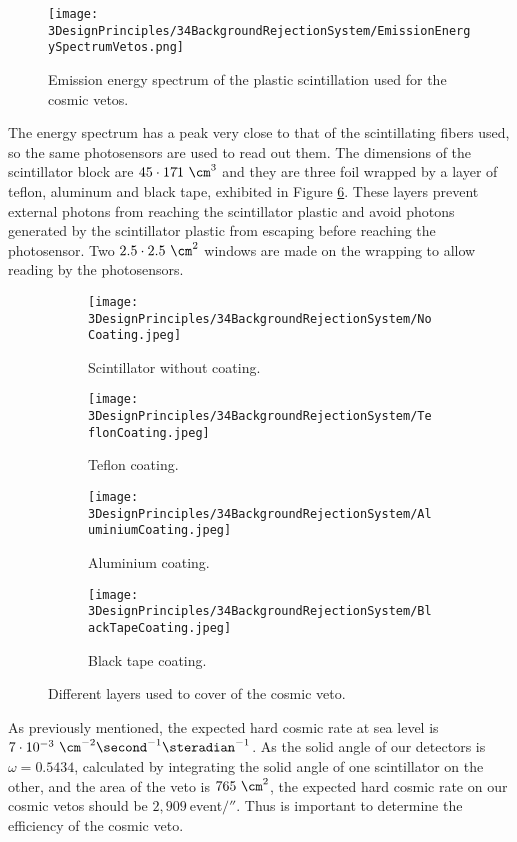 \begin{figure}[]
\centering
\texttt{[image: 3DesignPrinciples/34BackgroundRejectionSystem/EmissionEnergySpectrumVetos.png]}
\caption{Emission energy spectrum of the plastic scintillation used for the cosmic vetos.\label{fig:EmissionEnergySpectrumVeto}~\cite{ScintillatorVeto}}
\end{figure}

The energy spectrum has a peak very close to that of the scintillating fibers used, so the same photosensors are used to read out them. The dimensions of the scintillator block are $45 \cdot{} 17 \dot{} 1~\cm^3$ and they are three foil wrapped by a layer of teflon, aluminum and black tape, exhibited in Figure \ref{fig:LayersVeto}. These layers prevent external photons from reaching the scintillator plastic and avoid photons generated by the scintillator plastic from escaping before reaching the photosensor. Two $2.5\cdot{} 2.5 ~\cm^2$ windows are made on the wrapping to allow reading by the photosensors.


\begin{figure}
\centering
    \begin{subfigure}[b]{0.23\textwidth}
    \centering
    \texttt{[image: 3DesignPrinciples/34BackgroundRejectionSystem/NoCoating.jpeg]}  
    \caption{Scintillator without coating.\label{subfig:PlasticScintillatorNoCoating}}
    \end{subfigure}
    \hfill
    \begin{subfigure}[b]{0.23\textwidth}
    \centering
    \texttt{[image: 3DesignPrinciples/34BackgroundRejectionSystem/TeflonCoating.jpeg]}  
    \caption{Teflon coating.\label{subfig:PlasticScintillatorTeflon}}
    \end{subfigure}
    \hfill
    \begin{subfigure}[b]{0.23\textwidth}
    \centering
    \texttt{[image: 3DesignPrinciples/34BackgroundRejectionSystem/AluminiumCoating.jpeg]}  
    \caption{Aluminium coating.\label{subfig:PlasticScintillatorAluminium}}
    \end{subfigure}
    \hfill
    \begin{subfigure}[b]{0.23\textwidth}
    \centering
    \texttt{[image: 3DesignPrinciples/34BackgroundRejectionSystem/BlackTapeCoating.jpeg]}  
    \caption{Black tape coating.\label{subfig:PlasticScintillatorBlackTape}}
    \end{subfigure}
 \caption{Different layers used to cover of the cosmic veto.}
 \label{fig:LayersVeto}
\end{figure}

As previously mentioned, the expected hard cosmic rate at sea level is $7 \cdot{} 10^{-3}~\cm^{-2}\second^{-1}\steradian^{-1}$. As the solid angle of our detectors is $\omega=0.5434$, calculated by integrating the solid angle of one scintillator on the other, and the area of the veto is $765~\cm^2$, the expected hard cosmic rate on our cosmic vetos should be $2,909~$event$/\second$. Thus is important to determine the efficiency of the cosmic veto.